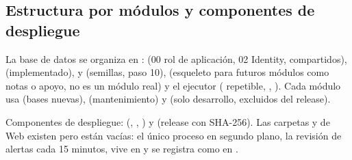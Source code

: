 \subsection{Estructura por módulos y componentes de despliegue}

La base de datos se organiza en : 
(00 rol de aplicación, 02 Identity, compartidos), 
(implementado),  y 
(semillas, paso 10),  (esqueleto para
futuros módulos como notas o apoyo, no es un módulo real) y el ejecutor
 ( repetible, ,
). Cada módulo usa  (bases nuevas),
 (mantenimiento) y  (solo desarrollo,
excluidos del release).

Componentes de despliegue: 
(, ,
) y 
(release  con SHA-256). Las carpetas
 y  de Web existen pero están
vacías: el único proceso en segundo plano, la revisión de alertas cada 15
minutos, vive en  y se registra como
 en .

